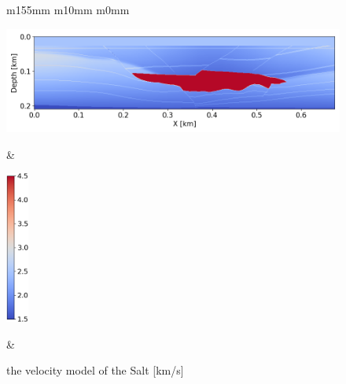 \begin{figure}[htbp]
    \centering
    \begin{tabular}{m{155mm} m{10mm} m{0mm}}
        \begin{minipage}[b]{160mm}
            \centering
            \includegraphics[width=160mm]{public/full_true_vm}
        \end{minipage} &
        \begin{minipage}[b]{\linewidth}
            \centering
            \vspace{-2mm}
            \includegraphics[height=50mm]{public/color-bar}
        \end{minipage} &
    \end{tabular}
    \caption{the velocity model of the Salt [km/s]}
    \label{fig:salt-model}
\end{figure}
